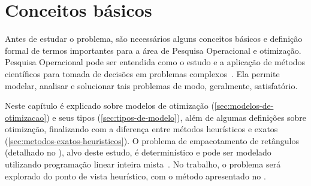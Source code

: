 \chapter{Conceitos básicos}\label{ch:conceitos-basicos}

Antes de estudar o problema, são necessários alguns conceitos básicos e definição formal de termos
importantes para a área de Pesquisa Operacional e otimização.
Pesquisa Operacional pode ser entendida como o estudo e a aplicação de métodos científicos para
tomada de decisões em problemas complexos~\cite[p.IX]{arenales}.
Ela permite modelar, analisar e solucionar tais problemas de modo, geralmente, satisfatório.

Neste capítulo é explicado sobre modelos de otimização (\autoref{sec:modelos-de-otimizacao})
e seus tipos (\autoref{sec:tipos-de-modelo}), além de algumas definições sobre otimização,
finalizando com a diferença entre métodos heurísticos e exatos
(\cref{sec:metodos-exatos-heuristicos}).
O problema de empacotamento de retângulos (detalhado no ),
alvo deste estudo, é determinístico e pode ser modelado utilizando programação linear inteira
mista~\cite{wolsey2020integer}.
No trabalho, o problema será explorado do ponto de vista heurístico, com o método apresentado no
.




